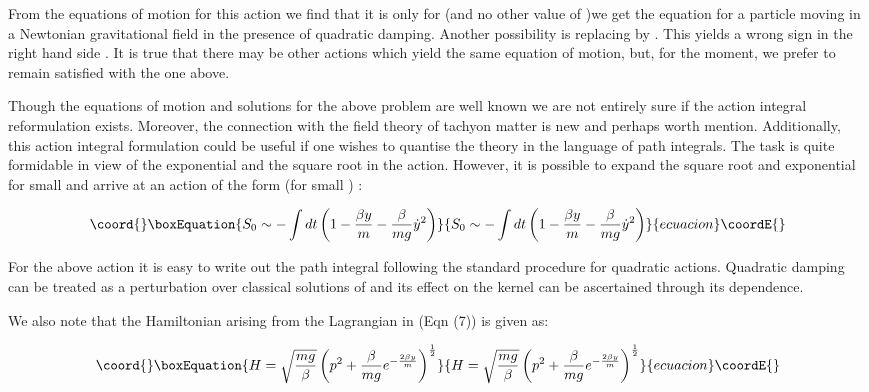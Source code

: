 \documentclass[a4paper,prd,aps,twocolumn]{revtex4}
\begin{document}
{From the equations of motion for this action we find that it is only 
for \coordHE{} (and no other value of \coordHE{})we get the
equation for a particle moving in a Newtonian gravitational field in 
the presence of quadratic damping. Another possibility is replacing 
\coordHE{} by \coordHE{}. This yields a wrong sign 
in the right hand side \coordHE{}.
It is true that there may be other actions which yield the
same equation of motion, but, for the moment, we prefer to remain
satisfied with the one above.

Though the equations of motion and solutions for the above problem are well
known we are not entirely sure if the 
action integral reformulation exists. Moreover, the connection
with the field theory of tachyon matter is new and perhaps worth mention.
Additionally, this action integral formulation could be useful if one
wishes to quantise the theory in the language of path integrals. The
task is quite formidable in view of the exponential and the square root
in the action. However, it is possible to expand the square root and
exponential for small \myHighlight{$\beta$}\coordHE{} and arrive at an action of the form (for
small \myHighlight{$\beta$}\coordHE{}) :

\begin{equation}\coord{}\boxEquation{
S_0 \sim -\int dt \left (1-\frac{\beta y}{m} -\frac{\beta}{mg}{\dot y}^2\right )
}{
S_0 \sim -\int dt \left (1-\frac{\beta y}{m} -\frac{\beta}{mg}{\dot y}^2\right )
}{ecuacion}\coordE{}\end{equation}

For the above action it is easy to write out the path integral following
the standard procedure for quadratic actions.  
Quadratic  damping can be treated as a perturbation over classical solutions
of \coordHE{} and its effect on the
kernel can be ascertained through its \myHighlight{$\beta$}\coordHE{} dependence.
 
We also note that the Hamiltonian arising from the  
Lagrangian in (Eqn (7)) is given as: 

\begin{equation}\coord{}\boxEquation{
H = \sqrt{\frac{mg}{\beta}} \left (p^2 + \frac{\beta}{mg}e^{-\frac{2\beta y}{m}}\right )^{\frac{1}{2}} 
}{
H = \sqrt{\frac{mg}{\beta}} \left (p^2 + \frac{\beta}{mg}e^{-\frac{2\beta y}{m}}\right )^{\frac{1}{2}} 
}{ecuacion}\coordE{}\end{equation}

}
\end{document}
